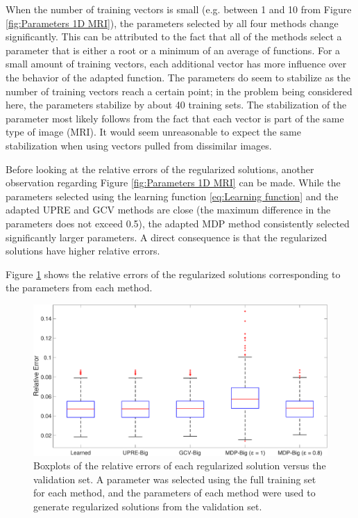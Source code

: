 \documentclass[12pt]{article}
\begin{document}
\noindent When the number of training vectors is small (e.g. between 1 and 10 from Figure \ref{fig:Parameters 1D MRI}), the parameters selected by all four methods change significantly. This can be attributed to the fact that all of the methods select a parameter that is either a root or a minimum of an average of functions. For a small amount of training vectors, each additional vector has more influence over the behavior of the adapted function. The parameters do seem to stabilize as the number of training vectors reach a certain point; in the problem being considered here, the parameters stabilize by about 40 training sets. The stabilization of the parameter most likely follows from the fact that each vector is part of the same type of image (MRI). It would seem unreasonable to expect the same stabilization when using vectors pulled from dissimilar images. \par 
Before looking at the relative errors of the regularized solutions, another observation regarding Figure \ref{fig:Parameters 1D MRI} can be made. While the parameters selected using the learning function \eqref{eq:Learning function} and the adapted UPRE and GCV methods are close (the maximum difference in the parameters does not exceed 0.5), the adapted MDP method consistently selected significantly larger parameters. A direct consequence is that the regularized solutions have higher relative errors. \par
Figure \ref{fig:Errors 1D MRI} shows the relative errors of the regularized solutions corresponding to the parameters from each method. 

\begin{figure}[ht]
\includegraphics[scale=0.36]{Figures/Errors1D_mri}
\caption{Boxplots of the relative errors of each regularized solution versus the validation set. A parameter was selected using the full training set for each method, and the parameters of each method were used to generate regularized solutions from the validation set.}
\label{fig:Errors 1D MRI}
\end{figure}
\end{document}
